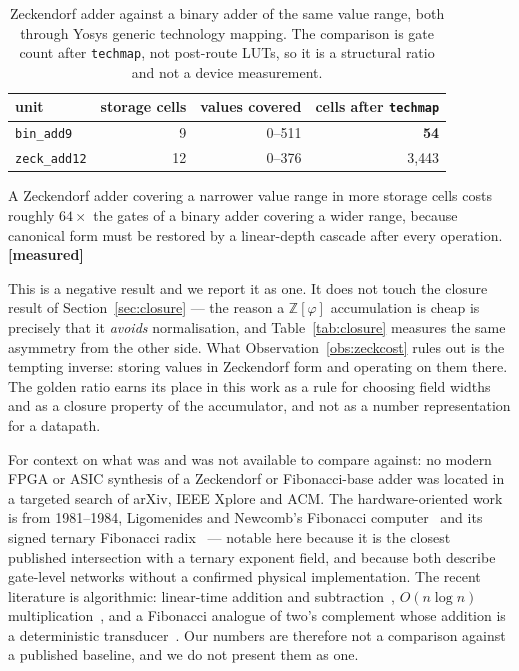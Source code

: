 \begin{table}[t]\centering
\caption{Zeckendorf adder against a binary adder of the same value range, both
through Yosys generic technology mapping. The comparison is gate count after
\texttt{techmap}, not post-route LUTs, so it is a structural ratio and not a
device measurement.}
\label{tab:zeckcost}
\begin{tabular}{lrrr}
\toprule
unit & storage cells & values covered & cells after \texttt{techmap} \\
\midrule
\texttt{bin\_add9}   & 9  & 0--511 & \textbf{54} \\
\texttt{zeck\_add12} & 12 & 0--376 & 3{,}443 \\
\bottomrule
\end{tabular}
\end{table}

\begin{observation}
\label{obs:zeckcost}
A Zeckendorf adder covering a narrower value range in more storage cells costs
roughly $64\times$ the gates of a binary adder covering a wider range, because
canonical form must be restored by a linear-depth cascade after every operation.
\textbf{[measured]}
\end{observation}

This is a negative result and we report it as one. It does not touch the closure
result of Section~\ref{sec:closure} --- the reason a $\mathbb{Z}[\varphi]$
accumulation is cheap is precisely that it \emph{avoids} normalisation, and
Table~\ref{tab:closure} measures the same asymmetry from the other side. What
Observation~\ref{obs:zeckcost} rules out is the tempting inverse: storing values
in Zeckendorf form and operating on them there. The golden ratio earns its place
in this work as a rule for choosing field widths and as a closure property of the
accumulator, and not as a number representation for a datapath.

For context on what was and was not available to compare against: no modern
FPGA or ASIC synthesis of a Zeckendorf or Fibonacci-base adder was located in a
targeted search of arXiv, IEEE Xplore and ACM. The hardware-oriented work is from
1981--1984, Ligomenides and Newcomb's Fibonacci
computer~\cite{ligomenides1981complement} and its signed ternary Fibonacci
radix~\cite{ligomenides1984multilevel} --- notable here because it is the
closest published intersection with a ternary exponent field, and because both
describe gate-level networks without a confirmed physical implementation. The
recent literature is algorithmic: linear-time addition and
subtraction~\cite{ahlbach2012efficient}, $O(n\log n)$
multiplication~\cite{idziaszek2021efficient}, and a Fibonacci analogue of
two's complement whose addition is a deterministic
transducer~\cite{labbe2022fibonacci}. Our numbers are therefore not a comparison
against a published baseline, and we do not present them as one.

